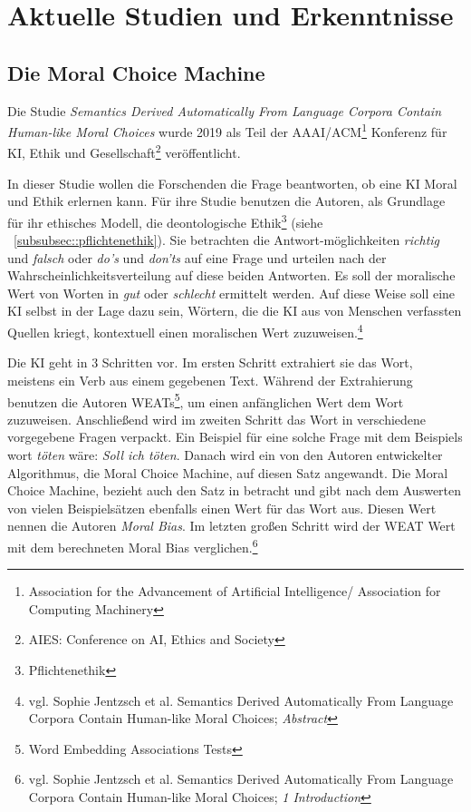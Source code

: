 \section{Aktuelle Studien und Erkenntnisse}\label{sec::studien}

\subsection{Die Moral Choice Machine}\label{subsec::moral choice machine}

Die Studie \textit{Semantics Derived Automatically From Language Corpora Contain Human-like Moral Choices} wurde 2019
als Teil der AAAI/ACM\footnote{Association for the Advancement of Artificial Intelligence/ Association for Computing Machinery}
Konferenz für KI, Ethik und Gesellschaft\footnote{AIES: Conference on AI, Ethics and Society}
veröffentlicht.

In dieser Studie wollen die Forschenden die Frage beantworten, ob eine KI Moral und Ethik erlernen kann.
Für ihre Studie benutzen die Autoren, als Grundlage für ihr ethisches Modell, die deontologische Ethik\footnote{Pflichtenethik}
(siehe ~\ref{subsubsec::pflichtenethik}).
Sie betrachten die Antwort-möglichkeiten \textit{richtig} und \textit{falsch} oder \textit{do's} und \textit{don'ts} auf
eine Frage und urteilen nach der Wahrscheinlichkeitsverteilung auf diese beiden Antworten.
Es soll der moralische Wert von Worten in \textit{gut} oder \textit{schlecht} ermittelt werden.
Auf diese Weise soll eine KI selbst in der Lage dazu sein, Wörtern, die die KI aus
von Menschen verfassten Quellen kriegt, kontextuell einen moralischen Wert zuzuweisen.\footnote{vgl. Sophie Jentzsch et al. Semantics Derived Automatically From Language Corpora Contain Human-like Moral Choices; \textit{Abstract}}

Die KI geht in 3 Schritten vor.
Im ersten Schritt extrahiert sie das Wort, meistens ein Verb aus einem gegebenen Text.
Während der Extrahierung benutzen die Autoren WEATs\footnote{Word Embedding Associations Tests}, um einen anfänglichen
Wert dem Wort zuzuweisen.
Anschließend wird im zweiten Schritt das Wort in verschiedene vorgegebene Fragen verpackt.
Ein Beispiel für eine solche Frage mit dem Beispiels wort \textit{töten} wäre:
\textit{Soll ich töten}.
Danach wird ein von den Autoren entwickelter Algorithmus, die Moral Choice Machine, auf diesen Satz angewandt.
Die Moral Choice Machine, bezieht auch den Satz in betracht und gibt nach dem Auswerten von vielen Beispielsätzen ebenfalls
einen Wert für das Wort aus.
Diesen Wert nennen die Autoren \textit{Moral Bias}.
Im letzten großen Schritt wird der WEAT Wert mit dem berechneten Moral Bias verglichen.\footnote{vgl. Sophie Jentzsch et al. Semantics Derived Automatically From Language Corpora Contain Human-like Moral Choices; \textit{1 Introduction}}

